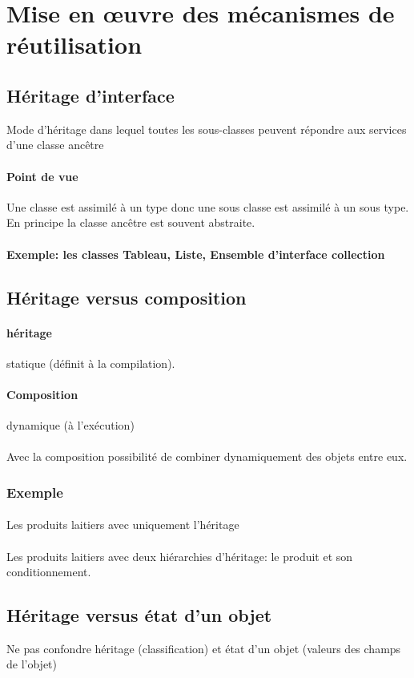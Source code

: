\section{Mise en œuvre des mécanismes de réutilisation}
\subsection{Héritage d'interface}
Mode d'héritage dans lequel toutes les sous-classes peuvent répondre aux services
d'une classe ancêtre
\paragraph{Point de vue}
Une classe est assimilé à un type donc une sous classe est assimilé à un sous type.\\
En principe la classe ancêtre est souvent abstraite.
\paragraph{Exemple: les classes Tableau, Liste, Ensemble d'interface collection}
\begin{center}
	
\end{center}
	

\subsection{Héritage versus composition}
\paragraph{héritage} statique (définit à la compilation). 
\paragraph{Composition} dynamique (à l'exécution)
\paragraph{}
Avec la composition possibilité de combiner dynamiquement des objets entre eux.

\subsubsection{Exemple}
\paragraph{} Les produits laitiers avec uniquement l'héritage
\begin{center}
	
\end{center}

\paragraph{} Les produits laitiers avec deux hiérarchies d'héritage: le produit et son conditionnement. 
\begin{center}
	
\end{center}

\subsection{Héritage versus état d'un objet}
Ne pas confondre héritage (classification) et état d'un objet 
(valeurs des champs de l'objet)


